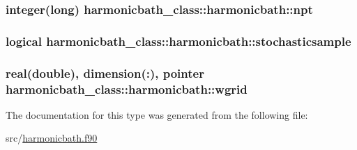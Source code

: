 \hypertarget{structharmonicbath__class_1_1harmonicbath_ab292a58613813f3ee812f949f9899089}{
\subsubsection[{npt}]{\setlength{\rightskip}{0pt plus 5cm}integer(long) harmonicbath\-\_\-class\-::harmonicbath\-::npt\hspace{0.3cm}{\ttfamily [private]}}}\label{structharmonicbath__class_1_1harmonicbath_ab292a58613813f3ee812f949f9899089}
\hypertarget{structharmonicbath__class_1_1harmonicbath_a1ae24e6ddcc5e0a0b80decc16a0865cb}{
\subsubsection[{stochasticsample}]{\setlength{\rightskip}{0pt plus 5cm}logical harmonicbath\-\_\-class\-::harmonicbath\-::stochasticsample\hspace{0.3cm}{\ttfamily [private]}}}\label{structharmonicbath__class_1_1harmonicbath_a1ae24e6ddcc5e0a0b80decc16a0865cb}
\hypertarget{structharmonicbath__class_1_1harmonicbath_a4268e843792e21ac9c78224a9e540e1f}{
\subsubsection[{wgrid}]{\setlength{\rightskip}{0pt plus 5cm}real(double), dimension(\-:), pointer harmonicbath\-\_\-class\-::harmonicbath\-::wgrid\hspace{0.3cm}{\ttfamily [private]}}}\label{structharmonicbath__class_1_1harmonicbath_a4268e843792e21ac9c78224a9e540e1f}


The documentation for this type was generated from the following file\-:\begin{DoxyCompactItemize}
\item 
src/\hyperlink{harmonicbath_8f90}{harmonicbath.\-f90}\end{DoxyCompactItemize}
